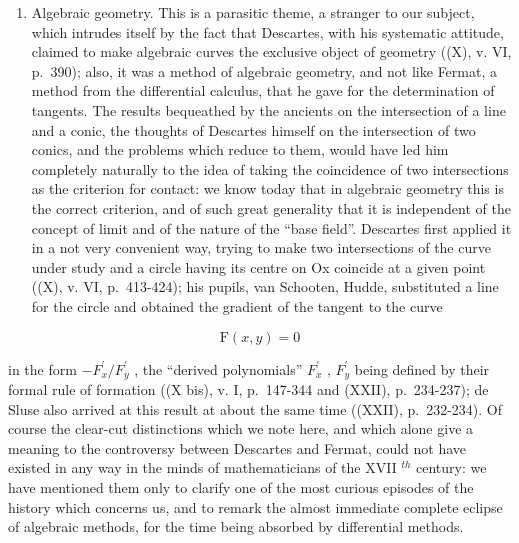 \begin{enumerate}
\def\labelenumi{\Alph{enumi})}
\setcounter{enumi}{2}
\tightlist
\item
  Algebraic geometry. This is a parasitic theme, a stranger to our subject, which intrudes itself by the fact that Descartes, with his systematic attitude, claimed to make algebraic curves the exclusive object of geometry ((X), v. VI, p.~390); also, it was a method of algebraic geometry, and not like Fermat, a method from the differential calculus, that he gave for the determination of tangents. The results bequeathed by the ancients on the intersection of a line and a conic, the thoughts of Descartes himself on the intersection of two conics, and the problems which reduce to them, would have led him completely naturally to the idea of taking the coincidence of two intersections as the criterion for contact: we know today that in algebraic geometry this is the correct criterion, and of such great generality that it is independent of the concept of limit and of the nature of the ``base field''. Descartes first applied it in a not very convenient way, trying to make two intersections of the curve under study and a circle having its centre on Ox coincide at a given point ((X), v. VI, p.~413-424); his pupils, van Schooten, Hudde, substituted a line for the circle and obtained the gradient of the tangent to the curve
\end{enumerate}

\[
\mathrm{F} (x, y) = 0
\]

in the form \(-F_{x}^{\prime}/F_{y}^{\prime}\) , the ``derived polynomials'' \(F_{x}^{\prime}\) , \(F_{y}^{\prime}\) being defined by their formal rule of formation ((X bis), v. I, p.~147-344 and (XXII), p.~234-237); de Sluse also arrived at this result at about the same time ((XXII), p.~232-234). Of course the clear-cut distinctions which we note here, and which alone give a meaning to the controversy between Descartes and Fermat, could not have existed in any way in the minds of mathematicians of the XVII \(^{th}\) century: we have mentioned them only to clarify one of the most curious episodes of the history which concerns us, and to remark the almost immediate complete eclipse of algebraic methods, for the time being absorbed by differential methods.

